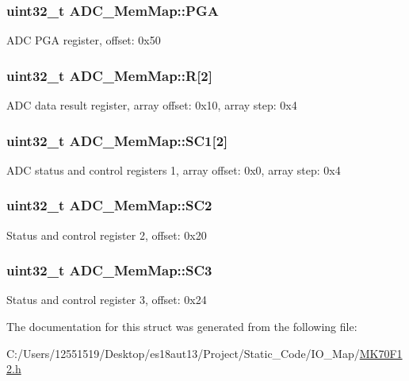 \subsubsection[{P\+G\+A}]{\setlength{\rightskip}{0pt plus 5cm}uint32\+\_\+t A\+D\+C\+\_\+\+Mem\+Map\+::\+P\+G\+A}\label{struct_a_d_c___mem_map_a3c43d657acb03daee1a6abbb58206a56}
A\+D\+C P\+G\+A register, offset\+: 0x50 \hypertarget{struct_a_d_c___mem_map_acbd8ded0e3f30d8502e9b9229e092fe8}{}
\subsubsection[{R}]{\setlength{\rightskip}{0pt plus 5cm}uint32\+\_\+t A\+D\+C\+\_\+\+Mem\+Map\+::\+R\mbox{[}2\mbox{]}}\label{struct_a_d_c___mem_map_acbd8ded0e3f30d8502e9b9229e092fe8}
A\+D\+C data result register, array offset\+: 0x10, array step\+: 0x4 \hypertarget{struct_a_d_c___mem_map_ab3900b4bfe889cd9d04850d121394741}{}
\subsubsection[{S\+C1}]{\setlength{\rightskip}{0pt plus 5cm}uint32\+\_\+t A\+D\+C\+\_\+\+Mem\+Map\+::\+S\+C1\mbox{[}2\mbox{]}}\label{struct_a_d_c___mem_map_ab3900b4bfe889cd9d04850d121394741}
A\+D\+C status and control registers 1, array offset\+: 0x0, array step\+: 0x4 \hypertarget{struct_a_d_c___mem_map_ad7caff2bf5e2dfb2159d174af24dc693}{}
\subsubsection[{S\+C2}]{\setlength{\rightskip}{0pt plus 5cm}uint32\+\_\+t A\+D\+C\+\_\+\+Mem\+Map\+::\+S\+C2}\label{struct_a_d_c___mem_map_ad7caff2bf5e2dfb2159d174af24dc693}
Status and control register 2, offset\+: 0x20 \hypertarget{struct_a_d_c___mem_map_a68295218c104f78bc2b11f04c06ce55e}{}
\subsubsection[{S\+C3}]{\setlength{\rightskip}{0pt plus 5cm}uint32\+\_\+t A\+D\+C\+\_\+\+Mem\+Map\+::\+S\+C3}\label{struct_a_d_c___mem_map_a68295218c104f78bc2b11f04c06ce55e}
Status and control register 3, offset\+: 0x24 

The documentation for this struct was generated from the following file\+:\begin{DoxyCompactItemize}
\item 
C\+:/\+Users/12551519/\+Desktop/es18aut13/\+Project/\+Static\+\_\+\+Code/\+I\+O\+\_\+\+Map/\hyperlink{_m_k70_f12_8h}{M\+K70\+F12.\+h}\end{DoxyCompactItemize}
